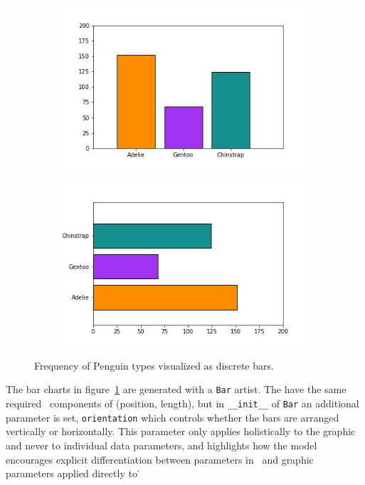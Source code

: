 \documentclass[../main.tex]{subfiles}
\begin{document}
\begin{figure}[H]
    \begin{subfigure}{0.5\textwidth}
        \includegraphics[width=\textwidth]{figures/code/bar_v.png}
    \end{subfigure}
    \begin{subfigure}{0.5\textwidth}
        \includegraphics[width=\textwidth]{figures/code/bar_h.png}
    \end{subfigure}
    \caption{Frequency of Penguin types visualized as discrete bars. }
    \label{fig:code_bar_simple}
\end{figure}
The bar charts in figure~\ref{fig:code_bar_simple} are generated with a \texttt{Bar} artist. The have the same required \vfiber\ components of (position, length), but in \texttt{__init__} of \texttt{Bar} an additional parameter is set, \texttt{orientation} which controls whether the bars are arranged vertically or horizontally. This parameter only applies holistically to the graphic and never to individual data parameters, and highlights how the model encourages explicit differentiation between parameters in \vtotal\ and graphic parameters applied directly to \vmarkd\. 
\end{document}
